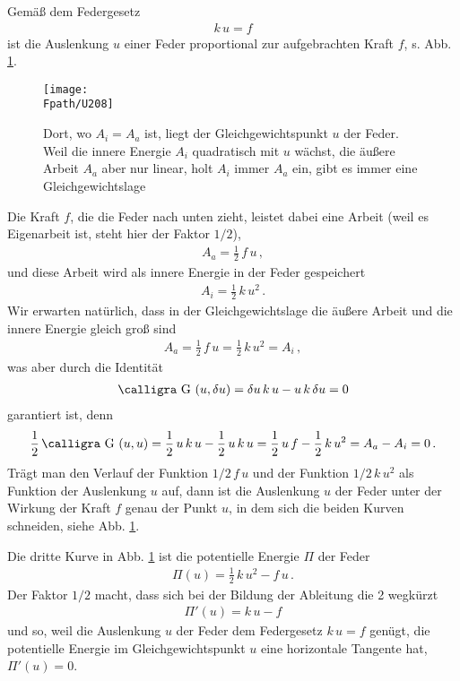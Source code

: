 {{{{{Gem\"{a}{\ss} dem Federgesetz
\begin{align}
k\,u = f
\end{align}
ist die Auslenkung $ u $ einer Feder proportional zur aufgebrachten Kraft $ f $, s. Abb. \ref{U208}.
\begin{figure}[tbp]
\if {} \sidecaption \fi
\centering
\texttt{[image: \\Fpath/U208]}
\caption{Dort, wo $A_i = A_a$ ist, liegt der Gleichgewichtspunkt $u$ der Feder. Weil die
innere Energie $A_i$ quadratisch mit $u$ w\"{a}chst, die \"{a}u{\ss}ere Arbeit $A_a$ aber nur
linear, holt $A_i$ immer $A_a$ ein, gibt es immer eine Gleichgewichtslage}
\label{U208}
\end{figure}%

Die Kraft $ f $, die die Feder nach unten zieht, leistet dabei eine Arbeit (weil es Eigenarbeit ist, steht hier der Faktor $1/2$),
\begin{align}
A_a = \frac{1}{2}\,f\,u\,,
\end{align}
und diese Arbeit wird als innere Energie in der Feder gespeichert
\begin{align}\label{Eq5}
A_i = \frac{1}{2}\, k\,u^2\,.
\end{align}
Wir erwarten nat\"{u}rlich, dass in der Gleichgewichtslage die \"{a}u{\ss}ere Arbeit und die innere Energie gleich gro{\ss} sind
\begin{align}
A_a = \frac{1}{2}\, f\,u =  \frac{1}{2}\, k\,u^2 = A_i\,,
\end{align}
was aber  durch die Identit\"{a}t
\begin{align}
\text{\normalfont\calligra G\,\,}(u,\delta u) = \delta u\,k\,u - u\,k\,\delta u = 0
\end{align}
garantiert ist, denn
\begin{align}
\frac{1}{2}\,\text{\normalfont\calligra G\,\,}(u,u) = \frac{1}{2}\, u\,k\,u - \frac{1}{2}\, u\,k\,u = \frac{1}{2}\, u\,f - \frac{1}{2}\, k\,u^2 = A_a - A_i = 0\,.
\end{align}
Tr\"{a}gt man den Verlauf der Funktion $1/2\,f\,u $ und der Funktion $1/2\,k\,u^2 $ als Funktion der Auslenkung $u$ auf, dann ist die Auslenkung $u$ der Feder  unter der Wirkung der Kraft $ f $ genau der Punkt $u$, in dem sich die beiden Kurven schneiden, siehe Abb. \ref{U208}.

Die dritte Kurve in Abb. \ref{U208} ist die potentielle Energie $\Pi$ der Feder
\begin{align}
\Pi(u) = \frac{1}{2}\, k\,u^2 - f\,u\,.
\end{align}
Der Faktor $1/2$ macht, dass sich bei der Bildung der Ableitung die 2 wegk\"{u}rzt
\begin{align}
\Pi'(u) = k\,u - f
\end{align}
und so, weil die Auslenkung $ u $ der Feder dem Federgesetz $k\,u = f $ gen\"{u}gt, die potentielle Energie im Gleichgewichtspunkt $u$ eine horizontale Tangente hat, $\Pi'(u) = 0$.

}}}}}
